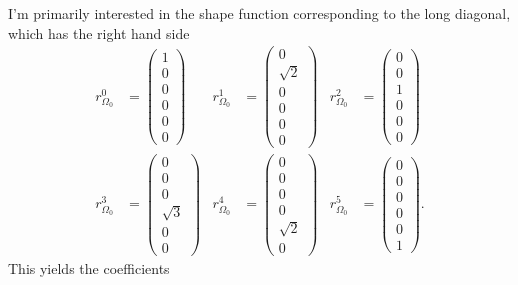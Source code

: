 \documentclass{scrartcl}
\begin{document}
I'm primarily interested in the shape function corresponding to the long
diagonal, which has the right hand side
\begin{align}
  r_{\Omega_0}^0&=\begin{pmatrix} 1 \\ 0 \\ 0 \\ 0 \\ 0 \\ 0 \end{pmatrix} &
  r_{\Omega_0}^1&=\begin{pmatrix} 0 \\ \sqrt2 \\ 0 \\ 0 \\ 0 \\ 0 \end{pmatrix} &
  r_{\Omega_0}^2&=\begin{pmatrix} 0 \\ 0 \\ 1 \\ 0 \\ 0 \\ 0 \end{pmatrix} \\
  r_{\Omega_0}^3&=\begin{pmatrix} 0 \\ 0 \\ 0 \\ \sqrt3 \\ 0 \\ 0 \end{pmatrix} &
  r_{\Omega_0}^4&=\begin{pmatrix} 0 \\ 0 \\ 0 \\ 0 \\ \sqrt2 \\ 0 \end{pmatrix} &
  r_{\Omega_0}^5&=\begin{pmatrix} 0 \\ 0 \\ 0 \\ 0 \\ 0 \\ 1 \end{pmatrix}.
\end{align}
This yields the coefficients
\end{document}
